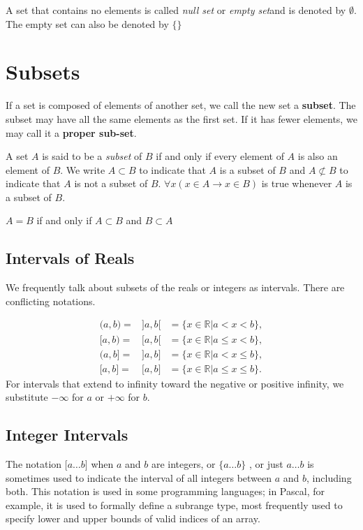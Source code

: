 \begin{definition}
A set that contains no elements is called \textit{null set} or \textit{empty set}and is denoted by $\emptyset$. The empty set can also be denoted by $\{ \}$
\end{definition}

\section{Subsets}
  If a set is composed of elements of another set, we call the new set a \textbf{subset}. The subset may have all the same elements as the first set. If it has fewer elements, we may call it a \textbf{proper sub-set}.
  
\begin {definition}[Subset]
A set $A$ is said to be a \textit{subset} of $B$ if and only if every element of $A$ is also an element of $B$.  We write $A \subset B$ to indicate that $A$ is a subset of $B$ and $A \not\subset B$ to indicate that $A$ is not a subset of $B$. $\forall x(x \in A \rightarrow x \in B)$ is true whenever $A$ is a subset of $B$.
\end {definition} 

\begin {theorem}
$A=B$  if and only if $A \subset B$ and $B \subset A$
\end {theorem}

 \subsection{Intervals of Reals}  
  We frequently talk about subsets of the reals or integers  as intervals. There are conflicting notations.

\begin{align*}
 \big( a,b\big) = &\big] a,b\big[ &= \{ x \in \mathbb{R}   |   a < x < b       \}, \\
 \big[a ,b\big) = &\big[ a,b\big[ &=  \{ x \in \mathbb{R}  | a \le x<b      \}, \\
 \big(a ,b\big] = &\big] a,b\big] &=  \{ x \in \mathbb{R}  | a < x \le b       \}, \\
 \big[ a,b\big] = &\big[ a,b\big]  &=  \{ x \in \mathbb{R} | a \le x \le  b  \}.
\end{align*}
For intervals that extend to infinity toward the negative or positive infinity, we substitute $-\infty$ for $a$ or $+\infty$ for $b$.

 \subsection{Integer Intervals}
 The notation $\big[ a \ldots b\big] $ when $a$ and $b$ are integers, or $\big\{a\ldots b\big\}$ , or just $a\ldots b$ is sometimes used to indicate the interval of all integers between $a$ and $b$, including both. This notation is used in some programming languages; in Pascal, for example, it is used to formally define a subrange type, most frequently used to specify lower and upper bounds of valid indices of an array.
 
